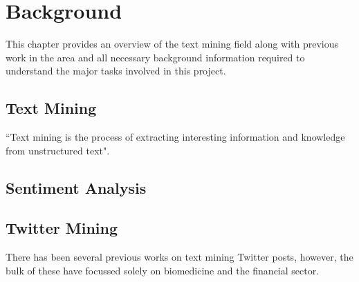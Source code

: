 \chapter{Background}
\label{cha:background}
This chapter provides an overview of the text mining field along with previous work in the area and all necessary background information required to understand the major tasks involved in this project.

\section{Text Mining}
``Text mining is the process of extracting interesting information and knowledge from unstructured text"\cite{hotho-etal-ldv-2005}.

\section{Sentiment Analysis}

\section{Twitter Mining}
There has been several previous works on text mining Twitter posts, however, the bulk of these have focussed solely on biomedicine and the financial sector.


